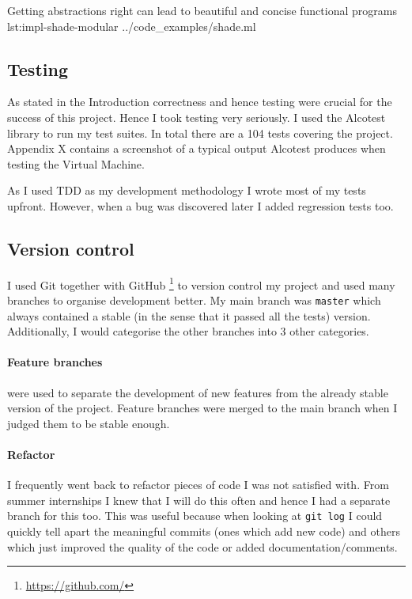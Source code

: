 \documentclass[class=article, crop=false]{standalone}
\begin{document}
{Getting abstractions right can lead to beautiful and concise functional
programs}
{lst:impl-shade-modular}
{../code_examples/shade.ml}

\subsection{Testing}

As stated in the Introduction correctness and hence testing were crucial for
the success of this project. Hence I took testing very seriously. I used the
Alcotest library to run my test suites. In total there are a 104 tests covering
the project. Appendix X contains a screenshot of a typical output Alcotest
produces when testing the Virtual Machine.

As I used TDD as my development methodology I wrote most of my tests upfront.
However, when a bug was discovered later I added regression tests too.

\subsection{Version control}

I used Git together with GitHub
\footnote{\url{https://github.com/}}
to version control my project and used many branches to organise development
better. My main branch was \verb|master| which always contained a stable (in
the sense that it passed all the tests) version. Additionally, I would
categorise the other branches into 3 other categories.

\paragraph{Feature branches} were used to separate the development of new
features from the already stable version of the project. Feature branches were 
merged to the main branch when I judged them to be stable enough.

\paragraph{Refactor} I frequently went back to refactor pieces of code I was
not satisfied with. From summer internships I knew that I will do this often
and hence I had a separate branch for this too. This was useful because when
looking at \verb|git log| I could quickly tell apart the meaningful commits
(ones which add new code) and others which just improved the quality of the
code or added documentation/comments.
\end{document}
